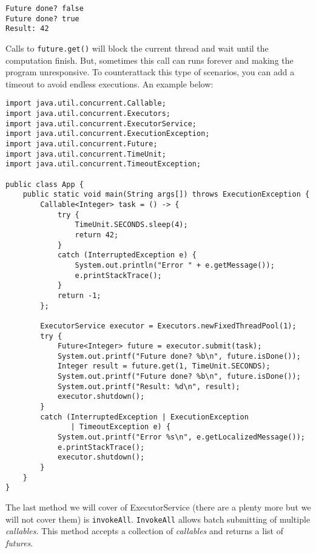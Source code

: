 \documentclass{latex/classes/myarticle}
\begin{document}
\begin{verbatim}
Future done? false
Future done? true
Result: 42
\end{verbatim}



Calls to \texttt{future.get()} will block the current thread and wait until the
computation finish. But, sometimes this call can runs forever and making the
program unresponsive. To counterattack this type of scenarios, you can add a
timeout to avoid endless executions. An example below:

\begin{lstlisting}
import java.util.concurrent.Callable;
import java.util.concurrent.Executors;
import java.util.concurrent.ExecutorService;
import java.util.concurrent.ExecutionException;
import java.util.concurrent.Future;
import java.util.concurrent.TimeUnit;
import java.util.concurrent.TimeoutException;

public class App {
    public static void main(String args[]) throws ExecutionException {
        Callable<Integer> task = () -> {
            try {
                TimeUnit.SECONDS.sleep(4);
                return 42;
            }
            catch (InterruptedException e) {
                System.out.println("Error " + e.getMessage());
                e.printStackTrace();
            }
            return -1;
        };

        ExecutorService executor = Executors.newFixedThreadPool(1);
        try {
            Future<Integer> future = executor.submit(task);
            System.out.printf("Future done? %b\n", future.isDone());
            Integer result = future.get(1, TimeUnit.SECONDS);
            System.out.printf("Future done? %b\n", future.isDone());
            System.out.printf("Result: %d\n", result);
            executor.shutdown();
        }
        catch (InterruptedException | ExecutionException
               | TimeoutException e) {
            System.out.printf("Error %s\n", e.getLocalizedMessage());
            e.printStackTrace();
            executor.shutdown();
        }
    }
}
\end{lstlisting}


The last method we will cover of ExecutorService (there are a plenty more
but we will not cover them) is \texttt{invokeAll}. \texttt{InvokeAll} allows batch submitting
of multiple \emph{callables}. This method accepts a collection of \emph{callables} and
returns a list of \emph{futures}.
\end{document}
